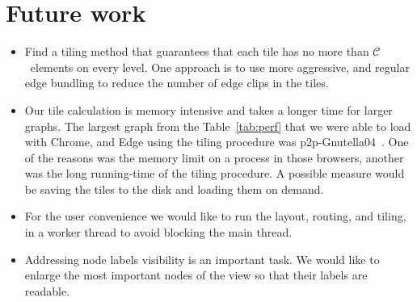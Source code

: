 \documentclass{llncs}
\newcommand{\capac}{$\mathcal{C}$}
\begin{document}
\section{Future work}
\begin{itemize}
\item Find a tiling method that guarantees that each tile has no more than \capac~elements on every level. One approach is to use more aggressive, and regular edge bundling to reduce the number of edge clips in the tiles.
\item
Our tile calculation is memory intensive and takes a longer time for larger graphs.
The largest graph from the Table~\ref{tab:perf} that we were able to load with Chrome, and Edge using the tiling procedure was p2p-Gnutella04~\cite{gnutella}. One of the reasons was the memory limit on a process in those browsers, another was the long running-time of the tiling procedure. A possible measure would be saving the tiles to the disk and loading them on demand.
\item
For the user convenience we would like to run the layout, routing, and tiling, in a worker thread to avoid blocking the main thread.
\item
Addressing node labels visibility is an important task.
We would like to enlarge the most important nodes of the view so that their labels are readable.
\end {itemize}



\end{document}
